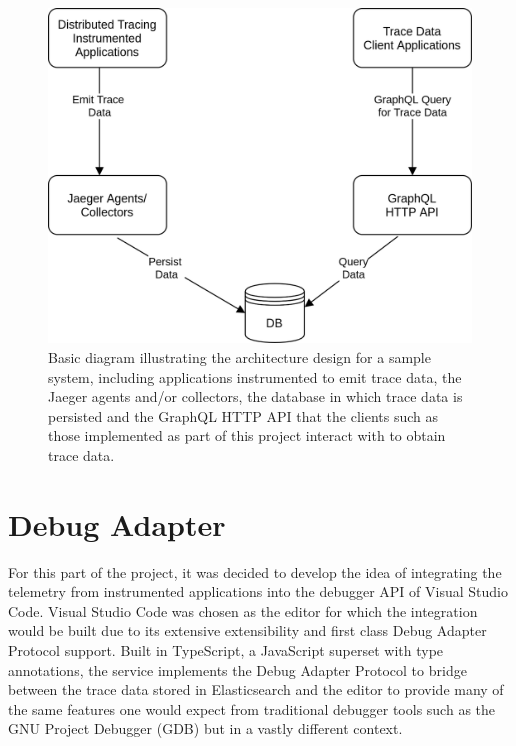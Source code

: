 \documentclass[12pt,pdftex,titlepage]{report}
\begin{document}
            \bigskip
            \begin{figure}[hbt!]
                \centering
                \includegraphics[scale=0.2]{arch.png}
                \caption{Basic diagram illustrating the architecture design for a sample system, including applications instrumented to emit trace data, the Jaeger agents and/or collectors,
                the database in which trace data is persisted and the GraphQL HTTP API that the clients such as those implemented as part of this project interact with to obtain trace data.}
                \label{fig:arch}
            \end{figure}

        \section{Debug Adapter}
            For this part of the project, it was decided to develop the idea of integrating the telemetry from instrumented applications into the debugger API of Visual Studio Code.
            Visual Studio Code was chosen as the editor for which the integration would be built due to its extensive extensibility and first class Debug Adapter Protocol support. 
            Built in TypeScript, a JavaScript superset with type annotations, the service implements the Debug Adapter Protocol to bridge between the trace data stored in Elasticsearch
            and the editor to provide many of the same features one would expect from traditional debugger tools such as the GNU Project Debugger (GDB)\cite{gdb} but in a vastly different
            context.
\end{document}

